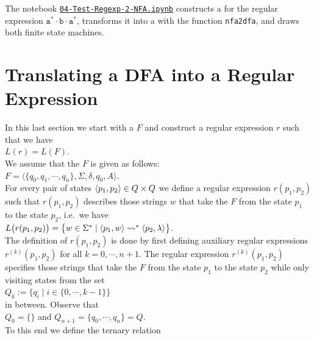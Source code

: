 The notebook
\href{https://github.com/karlstroetmann/Formal-Languages/blob/master/Python/Chapter-04-05/04-Test-Regexp-2-NFA.ipynb}{\texttt{04-Test-Regexp-2-NFA.ipynb}}
constructs a  for the regular expression $\texttt{a}^* \cdot \texttt{b} \cdot \texttt{a}^*$,
transforms it into a  with the function \texttt{nfa2dfa}, and draws both finite state machines.


\section{Translating a \textsc{DFA} into a Regular Expression}
In this last section we start with a  $F$ and construct a regular expression $r$
such that we have
\\[0.2cm]
\hspace*{1.3cm}
$L(r) = L(F)$. 
\\[0.2cm]
We assume that the  $F$ is given as follows:
\\[0.2cm]
\hspace*{1.3cm}
$F = \bigl\langle \{ q_0, q_1, \cdots, q_n \}, \Sigma, \delta, q_0, A \bigr\rangle$.
\\[0.2cm]
For every pair of states $\pair(p_1,p_2) \in Q \times Q$ we define a regular expression
$r(p_1, p_2)$ such that $r(p_1, p_2)$ describes those strings $w$ that take the  $F$ from the state
$p_1$ to the state $p_2$, i.e.~we have
\\[0.2cm]
\hspace*{1.3cm}
$L\bigl(r(p_1, p_2)\bigr) = 
  \bigl\{ w \in \Sigma^* \mid \pair(p_1,w) \leadsto^* \pair(p_2, \lambda) \bigr\}$.
\\[0.2cm]  
The definition of $r(p_1, p_2)$ is done by first defining auxiliary regular expressions 
$r^{(k)}(p_1, p_2)$ for all $k =0,\cdots,n+1$.   The regular expression $r^{(k)}(p_1, p_2)$ specifies those
strings that take the  $F$ from the state
$p_1$ to the state $p_2$ while only visiting states from the set
\\[0.2cm]
\hspace*{1.3cm}
$Q_k := \bigl\{ q_i \mid i \in \{0,\cdots,k-1 \}  \bigr\}$
\\[0.2cm]
in between.  Observe that
\\[0.2cm]
\hspace*{1.3cm}
$Q_0 = \{\}$ \quad and \quad $Q_{n+1} = \{q_0, \cdots, q_n \} = Q$.
\\[0.2cm]
To this end we define the ternary relation
\\[0.2cm]
